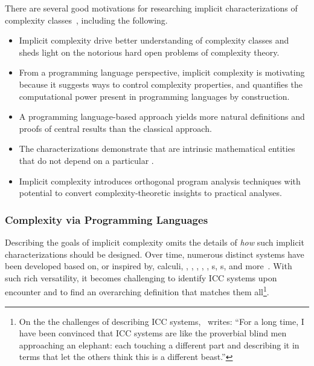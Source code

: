 There are several good motivations for researching implicit characterizations of
complexity classes~\cite[p.
36]{kristiansen2017,jones1999}, including the following.
\begin{itemize}

\item Implicit complexity drive better understanding of complexity
classes and sheds light on the notorious hard open
problems of complexity theory.

\item From a programming language perspective, implicit complexity is motivating
because it suggests ways to control complexity properties, and quantifies the
computational power present in programming languages by construction.

\item A programming language-based approach yields more {natural definitions and
proofs} of central results than the classical approach.

\item The characterizations demonstrate that  are
intrinsic mathematical entities that do not depend on a particular .

\item Implicit complexity introduces orthogonal program analysis techniques with
potential to convert complexity-theoretic insights to
practical analyses.

\end{itemize}

\subsubsection{Complexity via Programming Languages}

Describing the goals of implicit complexity omits the details of \emph{how} such
implicit characterizations should be designed. Over time, numerous distinct
systems have been developed based on, or inspired by, \eg calculi, , , , , , s, s, and
more~\cite{kristiansen2017,marion2011,moyen2017,baillot2012}. With such rich
versatility, it becomes challenging to identify ICC systems upon encounter and
to find an overarching definition that matches them all\footnote{ On the the
challenges of describing ICC systems,~\textcite[p. 14]{moyen2017} writes:
\enquote{For a long time, I have been convinced that ICC systems are like the
proverbial blind men approaching an elephant: each touching a different part and
describing it in terms that let the others think this is a different beast.}}.

